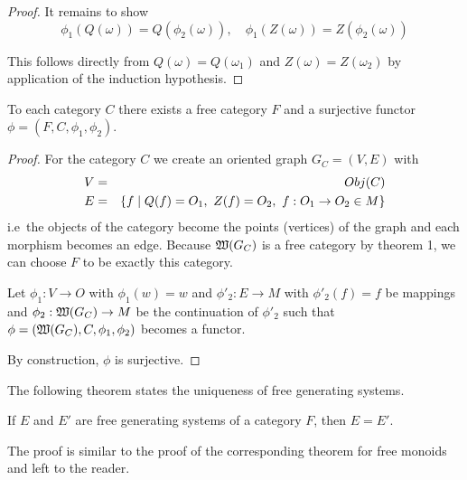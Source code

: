 \begin{proof}
It remains to show 
\[ \phi_1(Q(\omega)) = Q(\phi_2(\omega)),\quad \phi_1(Z(\omega)) =
Z(\phi_2(\omega)) \]

This follows directly from $Q(\omega) = Q(\omega_1)$ and $Z(\omega) =
Z(\omega_2)$ by application of the induction hypothesis.
\end{proof}

\bigskip
\begin{theorem}
To each category $C$ there exists a free category $F$ and a surjective functor
$\phi = (F, C, \phi_1, \phi_2)$.
\end{theorem}

\begin{proof}
For the category $C$ we create an oriented graph $G_C = (V, E)$ with 
\begin{eqnarray*}
V &=& Obj(C) \\
E &=& \mbox{$\{f \mid Q(f) = O_1,\ Z(f) = O_2,\ f : O_1 \to O_2 \in M\}$}
\end{eqnarray*}
i.e\ the objects of the category become the points (vertices) of the graph and
each morphism becomes an edge. Because $\mbox{$\mathfrak{W}({G_C})$}$ is a free category by
theorem 1, we can choose $F$ to be exactly this category.

Let $\phi_1 : V \to O$ with $\phi_1(w) = w$ and $\phi'_2 : E \to M$ with
$\phi'_2(f) = f$ be mappings and $\phi_2 : \mbox{$\mathfrak{W}({G_C})$} \to M$ be the
continuation of $\phi'_2$ such that $\phi = (\mbox{$\mathfrak{W}({G_C})$}, C, \phi_1, \phi_2)$
becomes a functor.

By construction, $\phi$ is surjective.
\end{proof}

\bigskip
The following theorem states the uniqueness of free generating systems.
\begin{theorem}
If $E$ and $E'$ are free generating systems of a category $F$, then $E = E'$.
\end{theorem}

The proof is similar to the proof of the corresponding theorem for free monoids
and left to the reader.
